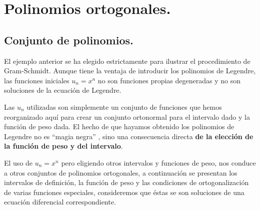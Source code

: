 \documentclass[12pt]{article}
\numberwithin{equation}{section}
\begin{document}
\section{Polinomios ortogonales.}
\subsection{Conjunto de polinomios.}

El ejemplo anterior se ha elegido estrictamente para ilustrar el procedimiento de Gram-Schmidt. Aunque tiene la ventaja de introducir los polinomios de Legendre, las funciones iniciales $u_{n} = x^{n}$ no son funciones propias degeneradas y no son soluciones de la ecuación de Legendre.
\par
Las $u_{n}$ utilizadas son simplemente un conjunto de funciones que hemos reorganizado aquí para crear un conjunto ortonormal para el intervalo dado y la función de peso dada. El hecho de que hayamos obtenido los polinomios de Legendre no es \enquote{magia negra} , sino una consecuencia directa \textbf{de la elección de la función de peso y del intervalo}.
\par
El uso de $u_{n} = x^{n}$ pero eligiendo otros intervalos y funciones de peso, nos conduce a otros conjuntos de polinomios ortogonales, a continuación se presentan los intervalos de definición, la función de peso y las condiciones de ortogonalización de varias funciones especiales, consideremos que éstas se son soluciones de una ecuación diferencial correspondiente. 
\end{document}
